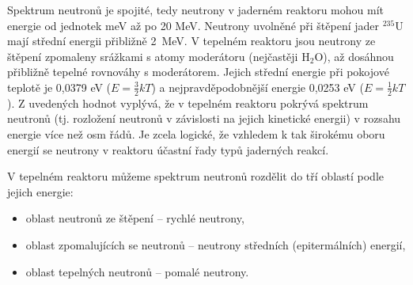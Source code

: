 Spektrum neutronů je spojité, tedy neutrony v jaderném reaktoru mohou mít energie od jednotek meV až po 20 MeV. Neutrony uvolněné při štěpení jader $^{235}$U mají střední energii přibližně 2~MeV. V tepelném reaktoru jsou neutrony ze štěpení zpomaleny srážkami s atomy moderátoru (nejčastěji H$_2$O), až dosáhnou přibližně tepelné rovnováhy s moderátorem. Jejich střední energie při pokojové teplotě je 0,0379 eV ($E = \frac{3}{2} kT$) a nejpravděpodobnější energie 0,0253 eV ($E=\frac{1}{2}kT$). Z uvedených hodnot vyplývá, že v tepelném reaktoru pokrývá spektrum neutronů (tj. rozložení neutronů v závislosti na jejich kinetické energii) v rozsahu energie více než osm řádů. Je zcela logické, že vzhledem k tak širokému oboru energií se neutrony v reaktoru účastní řady typů jaderných reakcí.



V tepelném reaktoru můžeme spektrum neutronů rozdělit do tří oblastí podle jejich energie:

\begin{itemize}%
    \item oblast neutronů ze štěpení -- rychlé neutrony,
    \item oblast zpomalujících se neutronů -- neutrony středních (epitermálních) energií,
    \item oblast tepelných neutronů -- pomalé neutrony.
\end{itemize}

